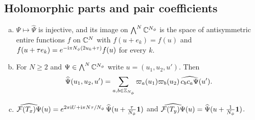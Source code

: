 \subsection{Holomorphic parts and pair coefficients}

\begin{lemma}\label{lem:holo}
\begin{enumerate}[(a)]
\item $\Psi\mapsto\widehat\Psi$ is injective, and its image on $\bigwedge^N\mathbb{C}^{N_{\phi}}$ is the space of antisymmetric entire
functions $f$ on $\mathbb{C}^N$ with $f(u+e_k)=f(u)$ and $f(u+\tau e_k)=e^{-\mathrm{i}\pi N_{\phi}(2u_k+\tau)}f(u)$ for every $k$.
\item For $N\ge2$ and $\Psi\in\bigwedge^N\mathbb{C}^{N_{\phi}}$ write $u=(u_1,u_2,u')$. Then
\[
\widehat\Psi(u_1,u_2,u')=\sum_{a,b\in\mathbb{Z}_{N_{\phi}}}\varpi_a(u_1)\varpi_b(u_2)\,\widehat{c_bc_a\Psi}(u').
\]
\item $\widehat{\mathcal{F}(T_x)\Psi}(u)=e^{2\pi\mathrm{i} U+\mathrm{i}\pi N\tau/N_{\phi}}\,\widehat\Psi(u+\tfrac{\tau}{N_{\phi}}\mathbf{1})$ and
$\widehat{\mathcal{F}(T_y)\Psi}(u)=\widehat\Psi(u+\tfrac1{N_{\phi}}\mathbf{1})$.
\end{enumerate}
\end{lemma}

